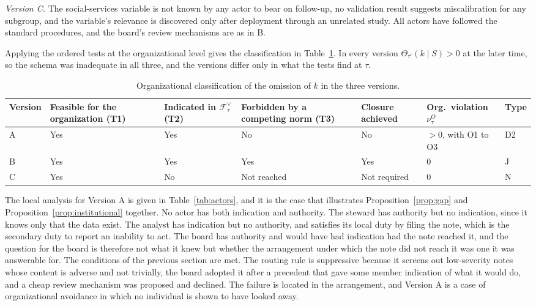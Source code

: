 \documentclass[11pt]{article}
\newcommand{\F}{\mathcal F}
\newcommand{\Th}{\Theta}
\theoremstyle{plain}
\theoremstyle{definition}
\begin{document}
\emph{Version C.} The social-services variable is not known by any actor to bear on follow-up, no validation result suggests miscalibration for any subgroup, and the variable's relevance is discovered only after deployment through an unrelated study. All actors have followed the standard procedures, and the board's review mechanisms are as in B.

Applying the ordered tests at the organizational level gives the classification in Table~\ref{tab:versions}. In every version $\Th_{\tau'}(k\mid S)>0$ at the later time, so the schema was inadequate in all three, and the versions differ only in what the tests find at $\tau$.

\begin{table}[h]
\centering
\small
\renewcommand{\arraystretch}{1.3}
\begin{tabular}{p{1.4cm}p{1.7cm}p{1.9cm}p{1.8cm}p{1.9cm}p{1.6cm}p{1.2cm}}
\hline
Version & Feasible for the organization (T1) & Indicated in $\F^{\vee}_\tau$ (T2) & Forbidden by a competing norm (T3) & Closure achieved & Org.\ violation $\nu^{O}_\tau$ & Type \\
\hline
A & Yes & Yes & No & No & $>0$, with O1 to O3 & D2 \\
B & Yes & Yes & Yes & Yes & $0$ & J \\
C & Yes & No & Not reached & Not required & $0$ & N \\
\hline
\end{tabular}
\caption{Organizational classification of the omission of $k$ in the three versions.}
\label{tab:versions}
\end{table}

The local analysis for Version A is given in Table~\ref{tab:actors}, and it is the case that illustrates Proposition~\ref{prop:gap} and Proposition~\ref{prop:institutional} together. No actor has both indication and authority. The steward has authority but no indication, since it knows only that the data exist. The analyst has indication but no authority, and satisfies its local duty by filing the note, which is the secondary duty to report an inability to act. The board has authority and would have had indication had the note reached it, and the question for the board is therefore not what it knew but whether the arrangement under which the note did not reach it was one it was answerable for. The conditions of the previous section are met. The routing rule is suppressive because it screens out low-severity notes whose content is adverse and not trivially, the board adopted it after a precedent that gave some member indication of what it would do, and a cheap review mechanism was proposed and declined. The failure is located in the arrangement, and Version A is a case of organizational avoidance in which no individual is shown to have looked away.
\end{document}
